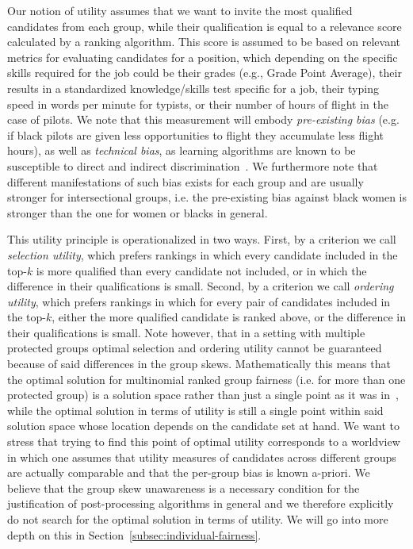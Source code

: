 Our notion of utility assumes that we want to invite the most qualified candidates from each group, while their qualification is equal to a relevance score calculated by a ranking algorithm.
%
This score is assumed to be based on relevant metrics for evaluating candidates for a position, which depending on the specific skills required for the job could be their grades (e.g., Grade Point Average), their results in a standardized knowledge/skills test specific for a job, their typing speed in words per minute for typists, or their number of hours of flight in the case of pilots.
%
We note that this measurement will embody \emph{pre-existing bias} (e.g. if black pilots are given less opportunities to flight they accumulate less flight hours), as well as \emph{technical bias}, as learning algorithms are known to be susceptible to direct and indirect discrimination~\cite{tuto2016,HajianFerrer12}.
%
We furthermore note that different manifestations of such bias exists for each group and are usually stronger for intersectional groups, i.e. the pre-existing bias against black women is stronger than the one for women or blacks in general.

This utility principle is operationalized in two ways.
%
First, by a criterion we call \emph{selection utility}, which prefers rankings in which every candidate included in the top-$k$ is more qualified than every candidate not included, or in which the difference in their qualifications is small.
%
Second, by a criterion we call \emph{ordering utility}, which prefers rankings in which for every pair of candidates included in the top-$k$, either the more qualified candidate is ranked above, or the difference in their qualifications is small.
%
Note however, that in a setting with multiple protected groups optimal selection and ordering utility cannot be guaranteed because of said differences in the group skews.
%
Mathematically this means that the optimal solution for multinomial ranked group fairness (i.e. for more than one protected group) is a solution space rather than just a single point as it was in~\cite{zehlike2017fair}, while the optimal solution in terms of utility is still a single point within said solution space whose location depends on the candidate set at hand.
%
We want to stress that trying to find this point of optimal utility corresponds to a worldview in which one assumes that utility measures of candidates across different groups are actually comparable and that the per-group bias is known a-priori.
%
We believe that the group skew unawareness is a necessary condition for the justification of post-processing algorithms in general and we therefore explicitly do not search for the optimal solution in terms of utility.
%
We will go into more depth on this in Section~\ref{subsec:individual-fairness}.

